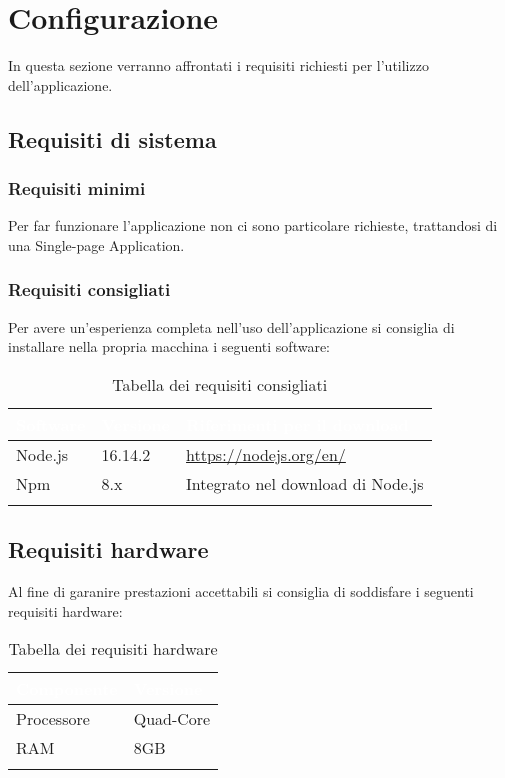 \chapter{Configurazione}
In questa sezione verranno affrontati i requisiti richiesti per l'utilizzo dell'applicazione.

\section{Requisiti di sistema}
    \subsection{Requisiti minimi}
        Per far funzionare l'applicazione non ci sono particolare richieste, trattandosi di una Single-page Application.

    \subsection{Requisiti consigliati}
        Per avere un'esperienza completa nell'uso dell'applicazione si consiglia di installare nella propria macchina i seguenti software: 
        \begin{longtable}{|p{2cm}|p{2cm}|p{6cm}|}
            \hline
            \rowcolor[HTML]{036400}
            \textcolor{white}{\textbf{Software}} & \textcolor{white}{\textbf{Versione}} & \textcolor{white}{\textbf{Riferimenti per il download}} \\ \hline
                \rowcolor[HTML]{EFEFEF}
                Node.js & 16.14.2 & \href{https://nodejs.org/en/}{https://nodejs.org/en/}  \\ \hline
                \rowcolor[HTML]{C0C0C0}
                Npm & 8.x & Integrato nel download di Node.js \\ \hline
                \caption{Tabella dei requisiti consigliati}
        \end{longtable}

\section{Requisiti hardware}
        Al fine di garanire prestazioni accettabili si consiglia di soddisfare i seguenti requisiti hardware:
        \begin{longtable}{|p{3cm}|p{3cm}|}
            \hline
            \rowcolor[HTML]{036400}
            \textcolor{white}{\textbf{Componente}} & \textcolor{white}{\textbf{Versione}} \\ \hline
                \rowcolor[HTML]{EFEFEF}
                Processore & Quad-Core \\ \hline
                \rowcolor[HTML]{C0C0C0}
                RAM & 8GB \\ \hline
                \caption{Tabella dei requisiti hardware}
        \end{longtable}


